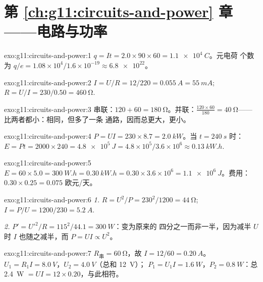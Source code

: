 \section*{第 \ref{ch:g11:circuits-and-power} 章——电路与功率}

\begin{solution}{exo:g11:circuits-and-power:1}
$q = It = 2.0 \times 90 \times 60 = \qty{1.1e4}{C}$。元电荷
个数为 $q/e = 1.08\times10^{4}/1.6\times10^{-19} \approx \num{6.8e22}$。
\end{solution}

\begin{solution}{exo:g11:circuits-and-power:2}
$I = U/R = 12/220 = \qty{0.055}{A} = \qty{55}{mA}$;
$R = U/I = 230/0.50 = \qty{460}{\ohm}$.
\end{solution}

\begin{solution}{exo:g11:circuits-and-power:3}
串联：$120 + 60 = \qty{180}{\ohm}$。并联：$\frac{120 \times 60}{180}
= \qty{40}{\ohm}$——比两者都小：相同，但多了一条
通路，因而总更大，更小。
\end{solution}

\begin{solution}{exo:g11:circuits-and-power:4}
$P = UI = 230 \times 8.7 = \qty{2.0}{kW}$。当 $t = \qty{240}{s}$ 时：
$E = Pt = 2000 \times 240 = \qty{4.8e5}{J} = 4.8\times10^{5}/3.6
\times10^{6} \approx \qty{0.13}{kW.h}$.
\end{solution}

\begin{solution}{exo:g11:circuits-and-power:5}
$E = 60 \times 5.0 = \qty{300}{W.h} = \qty{0.30}{kW.h} = 0.30 \times
3.6\times10^{6} = \qty{1.1e6}{J}$。费用：$0.30 \times 0.25 = 0.075$
欧元/天。
\end{solution}

\begin{solution}{exo:g11:circuits-and-power:6}
\emph{1.} $R = U^2/P = 230^2/1200 = \qty{44}{\ohm}$;
$I = P/U = 1200/230 = \qty{5.2}{A}$.

\emph{2.} $P' = U'^2/R = 115^2/44.1 = \qty{300}{W}$：变为原来的
四分之一而非一半，因为减半 $U$ 时 $I$ 也随之减半，而 $P = UI \propto U^2$。
\end{solution}

\begin{solution}{exo:g11:circuits-and-power:7}
$R_{\text{串}} = \qty{60}{\ohm}$，故 $I = 12/60 = \qty{0.20}{A}$。
$U_1 = R_1 I = \qty{8.0}{V}$，$U_2 = \qty{4.0}{V}$（总和 \qty{12}{V}）；
$P_1 = U_1 I = \qty{1.6}{W}$，$P_2 = \qty{0.8}{W}$：总 \qty{2.4}{W}
$= UI = 12 \times 0.20$，与此相符。
\end{solution}

